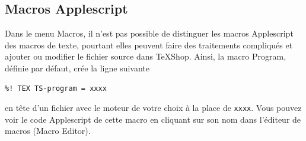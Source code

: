 \documentclass[11pt,french]{article}
\newcommand{\TS}{\textsf{\TeX Shop}}
\newcommand{\cmd}[1]{\textsf{#1}}
\newcommand{\mnu}[1]{\textsf{#1}}
\newcommand{\To}{\,\(\to\)\,}
\begin{document}
%

\subsection{Macros Applescript}

Dans le menu \mnu{Macros}, il n'est pas possible de distinguer les macros Applescript des macros de texte, pourtant elles peuvent faire des traitements compliqués et ajouter ou modifier le fichier source dans \TS{}. Ainsi, la macro \mnu{Program}, définie par défaut, crée la ligne suivante
\begin{verbatim}
%! TEX TS-program = xxxx
\end{verbatim}
en tête d'un fichier avec le moteur de votre choix à la place de \texttt{xxxx}. Vous pouvez voir le code Applescript de cette macro en cliquant sur son nom dans l'éditeur de macros (\mnu{Macro Editor}). 

\end{document}
